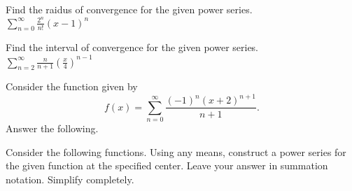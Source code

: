 \documentclass[addpoints]{exam}
\begin{document}
\begin{questions}

	\question[5] Find the raidus of convergence for the given power series.\\ $\displaystyle\sum_{n=0}^\infty \frac{2^n}{n!}(x-1)^n$


	\question[10] Find the interval of convergence for the given power series.\\ $\displaystyle\sum_{n=2}^\infty \frac{n}{n+1}\left(\frac{x}{4}\right)^{n-1}$


	\newpage

	\question[15] Consider the function given by
	\[f(x)=\sum_{n=0}^\infty\frac{(-1)^n (x+2)^{n+1}}{n+1}.\]
	Answer the following.

	\newpage

	\question[30] Consider the following functions. Using any means, construct a power series for the given function at the specified center. Leave your answer in summation notation. Simplify completely.


\end{questions}
\end{document}
